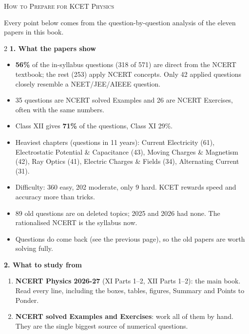 \clearpage
\begin{center}{}\par
{\fontsize{20}{24}\selectfont\color{navy}\scshape How to Prepare for KCET Physics}\par
{\color{gilt}}\end{center}\label{pplan}
\vspace{2pt}
{\small Every point below comes from the question-by-question analysis of the eleven papers in this book.}\par\medskip
\begin{multicols}{2}
\textbf{\color{crimson}1. What the papers show}\par\smallskip
\begin{itemize}[leftmargin=1.1em,itemsep=2pt,topsep=0pt]
\item \textbf{56\%} of the in-syllabus questions (318 of 571) are direct from the NCERT textbook; the rest (253) apply NCERT concepts. Only 42 applied questions closely resemble a NEET/JEE/AIEEE question.
\item 35 questions are NCERT solved Examples and 26 are NCERT Exercises, often with the same numbers.
\item Class XII gives \textbf{71\%} of the questions, Class XI 29\%.
\item Heaviest chapters (questions in 11 years): Current Electricity (61), Electrostatic Potential \& Capacitance (43), Moving Charges \& Magnetism (42), Ray Optics (41), Electric Charges \& Fields (34), Alternating Current (31).
\item Difficulty: 360 easy, 202 moderate, only 9 hard. KCET rewards speed and accuracy more than tricks.
\item 89 old questions are on deleted topics; 2025 and 2026 had none. The rationalised NCERT is the syllabus now.
\item Questions do come back (see the previous page), so the old papers are worth solving fully.
\end{itemize}\medskip
\textbf{\color{crimson}2. What to study from}\par\smallskip
\begin{enumerate}[leftmargin=1.3em,itemsep=2pt,topsep=0pt]
\item \textbf{NCERT Physics 2026-27} (XI Parts 1--2, XII Parts 1--2): the main book. Read every line, including the boxes, tables, figures, Summary and Points to Ponder.
\item \textbf{NCERT solved Examples and Exercises}: work all of them by hand. They are the single biggest source of numerical questions.

\end{enumerate}
\end{multicols}
